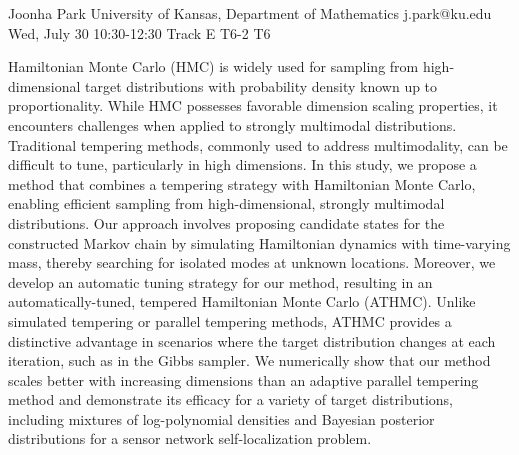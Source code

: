 \begin{talk}
  {Joonha Park}%
  {University of Kansas, Department of Mathematics}%
  {j.park@ku.edu}%
  {}%
  {}%
  {}%
  {Wed, July 30 10:30-12:30 Track E}%
  {T6-2}%
  {T6}%
  {}%
  
				

Hamiltonian Monte Carlo (HMC) is widely used for sampling from high-dimensional target distributions with probability density known up to proportionality. While HMC possesses favorable dimension scaling properties, it encounters challenges when applied to strongly multimodal distributions. Traditional tempering methods, commonly used to address multimodality, can be diﬃcult to tune, particularly in high dimensions. In this study, we propose a method that combines a tempering strategy with Hamiltonian Monte Carlo, enabling eﬃcient sampling from high-dimensional, strongly multimodal distributions. Our approach involves proposing candidate states for the constructed Markov chain by simulating Hamiltonian dynamics with time-varying mass, thereby searching for isolated modes at unknown locations. Moreover, we develop an automatic tuning strategy for our method, resulting in an automatically-tuned, tempered Hamiltonian Monte Carlo (ATHMC). Unlike simulated tempering or parallel tempering methods, ATHMC provides a distinctive advantage in scenarios where the target distribution changes at each iteration, such as in the Gibbs sampler. We numerically show that our method scales better with increasing dimensions than an adaptive parallel tempering method and demonstrate its eﬃcacy for a variety of target distributions, including mixtures of log-polynomial densities and Bayesian posterior distributions for a sensor network self-localization problem.
			
\end{talk}


